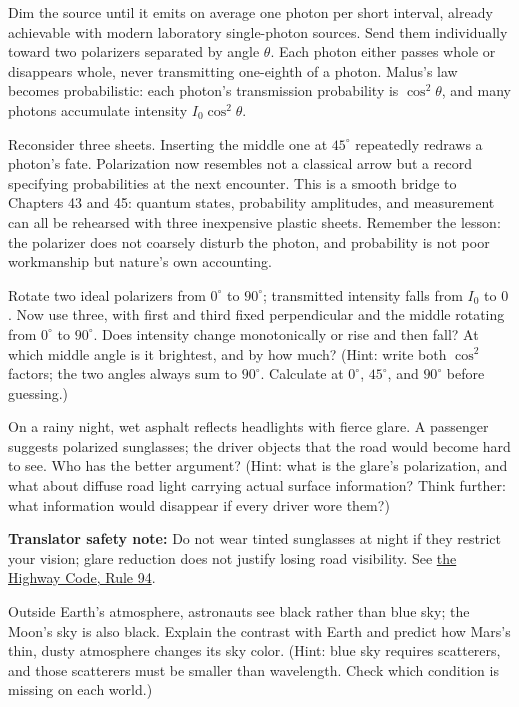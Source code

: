 \begin{thought}
Dim the source until it emits on average one photon per short interval, already achievable with modern laboratory single-photon sources. Send them individually toward two polarizers separated by angle \(\theta\). Each photon either passes whole or disappears whole, never transmitting one-eighth of a photon. Malus's law becomes probabilistic: each photon's transmission probability is \(\cos^2\theta\), and many photons accumulate intensity \(I_0\cos^2\theta\).

Reconsider three sheets. Inserting the middle one at \(45^\circ\) repeatedly redraws a photon's fate. Polarization now resembles not a classical arrow but a record specifying probabilities at the next encounter. This is a smooth bridge to Chapters 43 and 45: quantum states, probability amplitudes, and measurement can all be rehearsed with three inexpensive plastic sheets. Remember the lesson: the polarizer does not coarsely disturb the photon, and probability is not poor workmanship but nature's own accounting.
\end{thought}

\begin{puzzles}
\item Rotate two ideal polarizers from \(0^\circ\) to \(90^\circ\); transmitted intensity falls from \(I_0\) to \(0\). Now use three, with first and third fixed perpendicular and the middle rotating from \(0^\circ\) to \(90^\circ\). Does intensity change monotonically or rise and then fall? At which middle angle is it brightest, and by how much? (Hint: write both \(\cos^2\) factors; the two angles always sum to \(90^\circ\). Calculate at \(0^\circ\), \(45^\circ\), and \(90^\circ\) before guessing.)
\item On a rainy night, wet asphalt reflects headlights with fierce glare. A passenger suggests polarized sunglasses; the driver objects that the road would become hard to see. Who has the better argument? (Hint: what is the glare's polarization, and what about diffuse road light carrying actual surface information? Think further: what information would disappear if every driver wore them?)

\textbf{Translator safety note:} Do not wear tinted sunglasses at night if they restrict your vision; glare reduction does not justify losing road visibility. See \href{https://www.gov.uk/guidance/the-highway-code/rules-for-drivers-and-motorcyclists-89-to-102}{the Highway Code, Rule 94}.
\item Outside Earth's atmosphere, astronauts see black rather than blue sky; the Moon's sky is also black. Explain the contrast with Earth and predict how Mars's thin, dusty atmosphere changes its sky color. (Hint: blue sky requires scatterers, and those scatterers must be smaller than wavelength. Check which condition is missing on each world.)
\end{puzzles}
